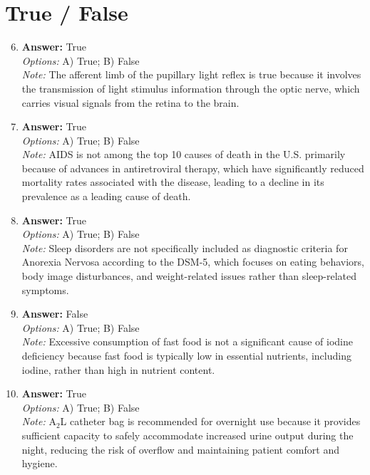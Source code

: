 \documentclass[12pt]{article}
\begin{document}
\section*{True / False}
\begin{enumerate}[label=\arabic*.]
\setcounter{enumi}{5}
\item \textbf{Answer:} True
\\ \textit{Options:} A) True; B) False
\\ \textit{Note:} The afferent limb of the pupillary light reflex is true because it involves the transmission of light stimulus information through the optic nerve, which carries visual signals from the retina to the brain.
\item \textbf{Answer:} True
\\ \textit{Options:} A) True; B) False
\\ \textit{Note:} AIDS is not among the top 10 causes of death in the U.S. primarily because of advances in antiretroviral therapy, which have significantly reduced mortality rates associated with the disease, leading to a decline in its prevalence as a leading cause of death.
\item \textbf{Answer:} True
\\ \textit{Options:} A) True; B) False
\\ \textit{Note:} Sleep disorders are not specifically included as diagnostic criteria for Anorexia Nervosa according to the DSM-5, which focuses on eating behaviors, body image disturbances, and weight-related issues rather than sleep-related symptoms.
\item \textbf{Answer:} False
\\ \textit{Options:} A) True; B) False
\\ \textit{Note:} Excessive consumption of fast food is not a significant cause of iodine deficiency because fast food is typically low in essential nutrients, including iodine, rather than high in nutrient content.
\item \textbf{Answer:} True
\\ \textit{Options:} A) True; B) False
\\ \textit{Note:} A$_{2}$L catheter bag is recommended for overnight use because it provides sufficient capacity to safely accommodate increased urine output during the night, reducing the risk of overflow and maintaining patient comfort and hygiene.
\end{enumerate}
\end{document}
